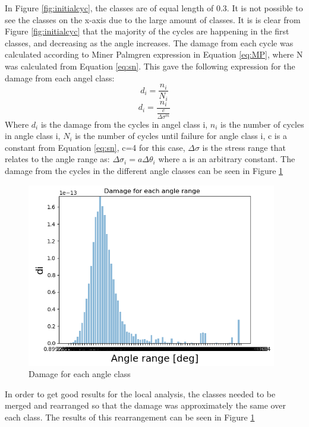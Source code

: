 \noindent In Figure \ref{fig:initialcyc}, the classes are of equal length of 0.3. It is not possible to see the classes on the x-axis due to the large amount of classes. It is is clear from Figure \ref{fig:initialcyc} that the majority of the cycles are happening in the first classes, and decreasing as the angle increases.\newline
\newline
The damage from each cycle was calculated according to Miner Palmgren expression in Equation \ref{eq:MP}, where N was calculated from Equation \ref{eq:sn}. This gave the following expression for the damage from each angel class: 
\begin{equation}
    d_i  = \frac{n_i}{N_i}
\end{equation}
\begin{equation}
    d_i=\frac{n_i}{\frac{c}{\Delta \sigma ^m}}
\end{equation}
Where $d_i$ is the damage from the cycles in angel class i, $n_i$ is the number of cycles in angle class i, $N_i$ is the number of cycles until failure for angle class i, c is a constant from Equation \ref{eq:sn}, c=4 for this case, $\Delta \sigma$ is the stress range that relates to the angle range as: $\Delta \sigma_i = a \Delta \theta_i$ where a is an arbitrary constant.\newline
\newline 
The damage from the cycles in the different angle classes can be seen in Figure \ref{fig:initialdam}

\begin{figure}[H]
\centering
\includegraphics[scale=0.9]{figures/initialdam}
\caption[Damage for each angle class]{Damage for each angle class}
 \label{fig:initialdam}
\end{figure}
\noindent In order to get good results for the local analysis, the classes needed to be merged and rearranged so that the damage was approximately the same over each class. The results of this rearrangement can be seen in Figure \ref{fig:initialdam}

